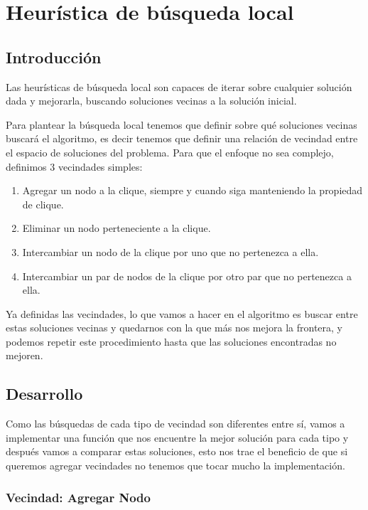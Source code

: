 \section{Heurística de búsqueda local}
\subsection{Introducción}
Las heurísticas de búsqueda local son capaces de iterar sobre cualquier solución dada y
mejorarla, buscando soluciones vecinas a la solución inicial.

Para plantear la búsqueda local tenemos que definir sobre qué soluciones vecinas buscará el algoritmo, es decir tenemos que definir una relación de vecindad entre el espacio de soluciones del problema. Para que el enfoque no sea complejo, definimos 3 vecindades simples:

\begin{enumerate}
	\item Agregar un nodo a la clique, siempre y cuando siga manteniendo la propiedad de clique.

	\item Eliminar un nodo perteneciente a la clique.

	\item Intercambiar un nodo de la clique por uno que no pertenezca a ella.

	\item Intercambiar un par de nodos de la clique por otro par que no pertenezca a ella.

\end{enumerate}

Ya definidas las vecindades, lo que vamos a hacer en el algoritmo es buscar entre estas soluciones vecinas y quedarnos con la que más nos mejora la frontera, y podemos repetir este procedimiento hasta que las soluciones encontradas no mejoren.


\subsection{Desarrollo}
Como las búsquedas de cada tipo de vecindad son diferentes entre sí, vamos a implementar una función que nos encuentre la mejor solución para cada tipo y después vamos a comparar estas soluciones, esto nos trae el beneficio de que si queremos agregar vecindades no tenemos que tocar mucho la implementación.

\subsubsection{Vecindad: Agregar Nodo}

